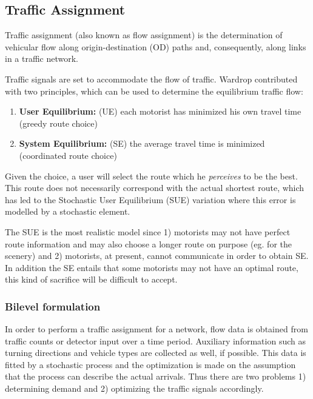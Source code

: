 \subsection{Traffic Assignment}
\label{sec:usereq}

Traffic assignment (also known as flow assignment) is the
determination of vehicular flow along origin-destination (OD) paths
and, consequently, along links in a traffic network.

Traffic signals are set to accommodate the flow of traffic. Wardrop
contributed with two principles, which can be used to determine the
equilibrium traffic flow:

\begin{enumerate}
\item \textbf{User Equilibrium:} (UE) each motorist has minimized his own travel time (greedy route choice)
\item \textbf{System Equilibrium:} (SE) the average travel time is minimized (coordinated route choice)
\end{enumerate}

Given the choice, a user will select the route which he
\textit{perceives} to be the best. This route does not necessarily
correspond with the actual shortest route, which has led to the
Stochastic User Equilibrium (SUE) variation \cite{32} where this error
is modelled by a stochastic element.

The SUE is the most realistic model since 1) motorists may not have
perfect route information and may also choose a longer route on
purpose (eg. for the scenery) and 2) motorists, at present, cannot
communicate in order to obtain SE. In addition the SE entails that
some motorists may not have an optimal route, this kind of sacrifice
will be difficult to accept.

\subsubsection*{Bilevel formulation}
\label{sec:bilevel}

In order to perform a traffic assignment for a network, flow data is
obtained from traffic counts or detector input over a time
period. Auxiliary information such as turning directions and vehicle
types are collected as well, if possible. This data is fitted by a
stochastic process and the optimization is made on the assumption that
the process can describe the actual arrivals. Thus there are two
problems 1) determining demand and 2) optimizing the traffic signals
accordingly.

